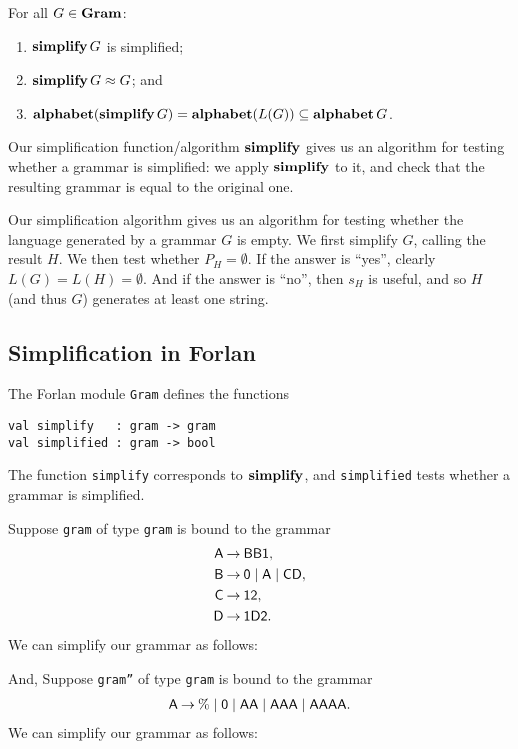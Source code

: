 \begin{theorem}
For all $G\in\mathbf{Gram}$:
\begin{enumerate}[\quad(1)]
\item $\mathbf{simplify}\,G$ is simplified;

\item $\mathbf{simplify}\,G\approx G$; and

\item $\mathbf{alphabet}(\mathbf{simplify}\,G) = \mathbf{alphabet}(L(G)) \subseteq\mathbf{alphabet}\,G$.
\end{enumerate}
\end{theorem}

Our simplification function/algorithm $\mathbf{simplify}$ gives us an
algorithm for testing whether a grammar is simplified: we apply
$\mathbf{simplify}$ to it, and check that the resulting grammar is equal to
the original one.

Our simplification algorithm gives us an algorithm for testing whether
the language generated by a grammar $G$ is empty. We first simplify $G$,
calling the result $H$. We then test whether $P_H=\emptyset$.  If
the answer is ``yes'', clearly $L(G)=L(H)=\emptyset$. And if the
answer is ``no'', then $s_H$ is useful, and so $H$ (and thus $G$) generates
at least one string.

\subsection{Simplification in Forlan}

The Forlan module \texttt{Gram} defines the functions
\begin{verbatim}
val simplify   : gram -> gram
val simplified : gram -> bool
\end{verbatim}
The function \texttt{simplify} corresponds to $\mathbf{simplify}$, and
\texttt{simplified} tests whether a grammar is simplified.

Suppose \texttt{gram} of type \texttt{gram} is bound to the grammar
\begin{align*}
\mathsf{A} &\mathbin{\to} \mathsf{BB1}, \\
\mathsf{B} &\mathbin{\to} \mathsf{0}\mid\mathsf{A}\mid\mathsf{C}\mathsf{D}, \\
\mathsf{C} &\mathbin{\to} \mathsf{1}\mathsf{2} , \\
\mathsf{D} &\mathbin{\to} \mathsf{1}\mathsf{D}\mathsf{2} .
\end{align*}
We can simplify our grammar as follows:

And, Suppose \texttt{gram''} of type \texttt{gram} is bound to the grammar
\begin{align*}
\mathsf{A} \mathbin{\to} \% \mid \mathsf{0} \mid \mathsf{AA} \mid \mathsf{AAA} \mid
\mathsf{AAAA} .
\end{align*}
We can simplify our grammar as follows:



